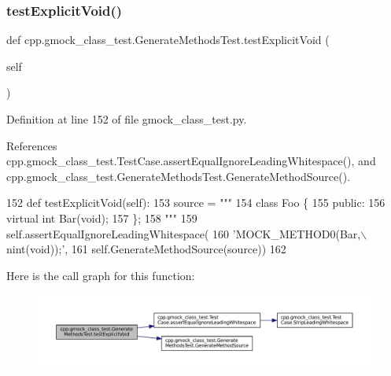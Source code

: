 \subsubsection{\texorpdfstring{test\+Explicit\+Void()}{testExplicitVoid()}}
{\footnotesize\ttfamily def cpp.\+gmock\+\_\+class\+\_\+test.\+Generate\+Methods\+Test.\+test\+Explicit\+Void (\begin{DoxyParamCaption}\item[{}]{self }\end{DoxyParamCaption})}



Definition at line 152 of file gmock\+\_\+class\+\_\+test.\+py.



References cpp.\+gmock\+\_\+class\+\_\+test.\+Test\+Case.\+assert\+Equal\+Ignore\+Leading\+Whitespace(), and cpp.\+gmock\+\_\+class\+\_\+test.\+Generate\+Methods\+Test.\+Generate\+Method\+Source().


\begin{DoxyCode}
152   \textcolor{keyword}{def }testExplicitVoid(self):
153     source = \textcolor{stringliteral}{"""}
154 \textcolor{stringliteral}{class Foo \{}
155 \textcolor{stringliteral}{ public:}
156 \textcolor{stringliteral}{  virtual int Bar(void);}
157 \textcolor{stringliteral}{\};}
158 \textcolor{stringliteral}{"""}
159     self.assertEqualIgnoreLeadingWhitespace(
160         \textcolor{stringliteral}{'MOCK\_METHOD0(Bar,\(\backslash\)nint(void));'},
161         self.GenerateMethodSource(source))
162 
\end{DoxyCode}
Here is the call graph for this function\+:
\nopagebreak
\begin{figure}[H]
\begin{center}
\leavevmode
\includegraphics[width=350pt]{classcpp_1_1gmock__class__test_1_1GenerateMethodsTest_a4db373bb8953d0523425b5a3f392e761_cgraph}
\end{center}
\end{figure}
\mbox{\label{classcpp_1_1gmock__class__test_1_1GenerateMethodsTest_a41b91cc39a55385b8c4b97d804e80345}} 
